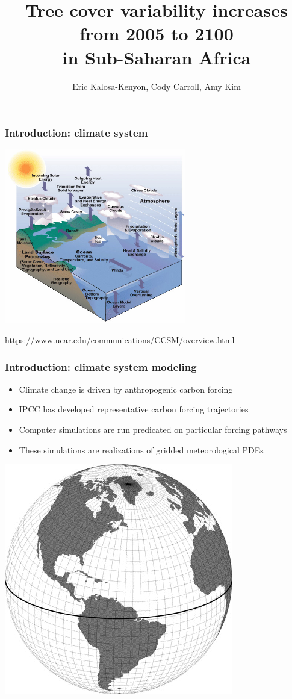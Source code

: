 \documentclass{beamer}
\title{Tree cover variability increases from 2005 to 2100\\ in Sub-Saharan Africa}
\author{Eric Kalosa-Kenyon, Cody Carroll, Amy Kim}
\institute{University of California, Davis}
\date{}
\begin{document}
\frame{\titlepage}

\begin{frame}
    \frametitle{Introduction: climate system}
    \includegraphics[height=3in]{../img/ccsm_diagram_picture.jpeg}

    https://www.ucar.edu/communications/CCSM/overview.html
\end{frame}

\begin{frame}
    \frametitle{Introduction: climate system modeling}
    \begin{itemize}
        \item Climate change is driven by anthropogenic carbon forcing
        \item IPCC has developed representative carbon forcing trajectories
        \item Computer simulations are run predicated on particular forcing
            pathways
        \item These simulations are realizations of gridded meteorological PDEs
    \end{itemize}
    \includegraphics[width=\textwidth/2]{../img/greenland_pole_grid.jpg}
\end{frame}
\end{document}
